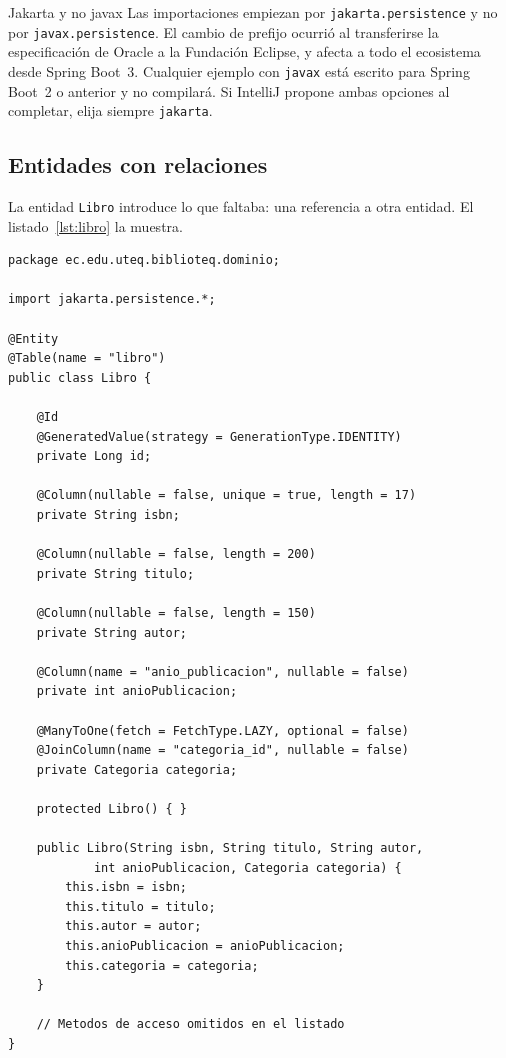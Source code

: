 \documentclass[11pt,a4paper,openany]{book}
\begin{document}
\begin{cajaadvertencia}{Jakarta y no javax}
	Las importaciones empiezan por \texttt{jakarta.persistence} y no por \texttt{javax.persistence}. El cambio de prefijo ocurrió al transferirse la especificación de Oracle a la Fundación Eclipse, y afecta a todo el ecosistema desde Spring Boot~3. Cualquier ejemplo con \texttt{javax} está escrito para Spring Boot~2 o anterior y no compilará. Si IntelliJ propone ambas opciones al completar, elija siempre \texttt{jakarta}.
\end{cajaadvertencia}

\subsection{Entidades con relaciones}
\label{sec:entidades-relacion}

La entidad \texttt{Libro} introduce lo que faltaba: una referencia a otra entidad. El listado~\ref{lst:libro} la muestra.

\begin{lstlisting}[style=java,caption={Entidad Libro con su relacion hacia Categoria.},label={lst:libro}]
package ec.edu.uteq.biblioteq.dominio;

import jakarta.persistence.*;

@Entity
@Table(name = "libro")
public class Libro {

	@Id
	@GeneratedValue(strategy = GenerationType.IDENTITY)
	private Long id;

	@Column(nullable = false, unique = true, length = 17)
	private String isbn;

	@Column(nullable = false, length = 200)
	private String titulo;

	@Column(nullable = false, length = 150)
	private String autor;

	@Column(name = "anio_publicacion", nullable = false)
	private int anioPublicacion;

	@ManyToOne(fetch = FetchType.LAZY, optional = false)
	@JoinColumn(name = "categoria_id", nullable = false)
	private Categoria categoria;

	protected Libro() { }

	public Libro(String isbn, String titulo, String autor,
			int anioPublicacion, Categoria categoria) {
		this.isbn = isbn;
		this.titulo = titulo;
		this.autor = autor;
		this.anioPublicacion = anioPublicacion;
		this.categoria = categoria;
	}

	// Metodos de acceso omitidos en el listado
}
\end{lstlisting}
\end{document}
